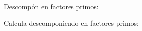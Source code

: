 \documentclass[spanish, 11pt]{exam}
\begin{document}
\begin{questions}


    \question[1\half] Descompón en factores primos:
    \begin{multicols}{2}
    \end{multicols}

    \question[1\half] Calcula descomponiendo en factores primos:
    \begin{multicols}{2}
    \begin{parts}

\end{parts}
\end{multicols}
\end{questions}
\end{document}
